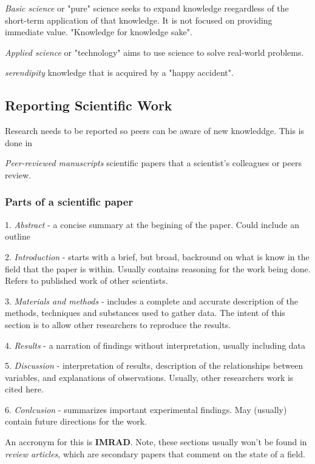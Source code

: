 \documentclass{article}
\theoremstyle{definition}
\begin{document}
 \textit{Basic science} or "pure" science seeks to expand knowledge reegardless of the short-term application of that knowledge. It is not focused on providing immediate value. "Knowledge for knowledge sake".

 \textit{Applied science} or "technology" aims to use science to solve real-world problems.

 \textit{serendipity} knowledge that is acquired by a "happy accident".

\subsection{Reporting Scientific Work}
Research needs to be reported so peers can be aware of new knowleddge. This is done in

 \textit{Peer-reviewed manuscripts} scientific papers that a scientist's colleagues or peers review.

\subsubsection{Parts of a scientific paper}

1. \textit{Abstract} - a concise summary at the begining of the paper. Could include an outline

2. \textit{Introduction} - starts with a brief, but broad, backround on what is know in the field that the paper is within. Usually contains reasoning for the work being done. Refers to published work of other scientists. 

3. \textit{Materials and methods} - includes a complete and accurate description of the methods, techniques and substances used to gather data. The intent of this section is to allow other researchers to reproduce the results.

4. \textit{Results} - a narration of findings without interpretation, usually including data

5. \textit{Discussion} - interpretation of results, description of the relationships between variables, and explanations of observations. Usually, other researchers work is cited here.

6. \textit{Conlcusion} - summarizes important experimental findings. May (usually) contain future directions for the work.

An accronym for this is \textbf{IMRAD}. Note, these sections usually won't be found in \textit{review articles}, which are secondary papers that comment on the state of a field.
\end{document}
